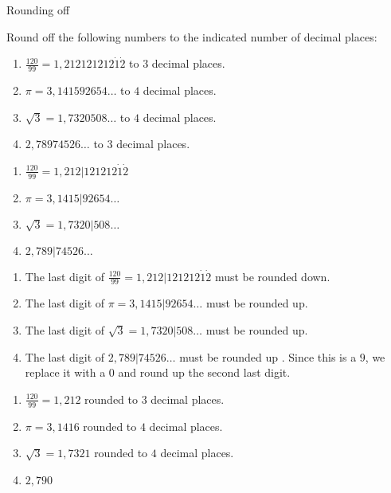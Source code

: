 \begin{wex}{Rounding off }

{Round off the following numbers to the indicated number of decimal places: 
\begin{enumerate}[itemsep=5pt, label=\textbf{\arabic*}. ] 

\item $\frac{120}{99}=1,212121212\dot{1}\dot{2}$ to $3$ decimal places.
\item $\pi =3,141592654\ldots$ to $4$ decimal places.
\item $\sqrt{3}=1,7320508\ldots$ to $4$ decimal places.
\item $2,78974526\ldots$ to $3$ decimal places.
\end{enumerate}
}
{


\begin{enumerate}[itemsep=5pt, label=\textbf{\arabic*}. ] 
\item $\frac{120}{99}=1,212|121212\dot{1}\dot{2}$
\item $\pi =3,1415|92654\ldots$
\item $\sqrt{3}=1,7320|508\ldots$
\item $2,789|74526\ldots$
\end{enumerate}

\begin{enumerate}[itemsep=5pt, label=\textbf{\arabic*}. ]
\item The last digit of $\frac{120}{99}=1,212|121212\dot{1}\dot{2}$  must be rounded down.
\item The last digit of $\pi =3,1415|92654\ldots$ must be rounded up.
\item The last digit of $\sqrt{3}=1,7320|508\ldots$ must be rounded up.
\item  The last digit of $2,789|74526\ldots$ must be rounded up .
\newline Since this is a $9$, we replace it with a $0$ and round up the second last digit.
\end{enumerate}

\begin{enumerate}[itemsep=5pt, label=\textbf{\arabic*}. ]
\item $\frac{120}{99}=1,212$ rounded to $3$ decimal places.
\item $\pi =3,1416$  rounded to $4$ decimal places.
\item $\sqrt{3}=1,7321$ rounded to $4$ decimal places.
\item $2,790$
\end{enumerate}
}  
\end{wex}

